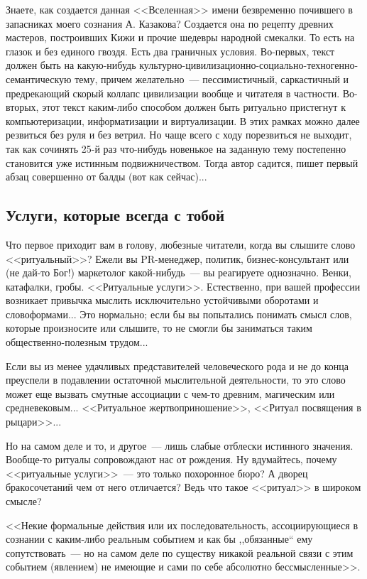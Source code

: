 \documentclass{scrbook}
\newcommand{\glqq}{,,}
\newcommand{\grqq}{``}
\newcommand{\flqq}{<<}
\newcommand{\frqq}{>>}
\newcommand{\mdash}{~--- }
\newcommand{\essaysection}[1]{\subsection*{#1}\nopagebreak}
\begin{document}
Знаете, как создается данная {\flqq}Вселенная{\frqq} имени безвременно почившего в запасниках моего сознания А. Казакова? Создается она по рецепту древних мастеров, построивших Кижи и прочие шедевры народной смекалки. То есть на глазок и без единого гвоздя. Есть два граничных условия. Во-первых, текст должен быть на какую-нибудь культурно-цивилизационно-социально-техногенно-семантическую тему, причем желательно{\mdash}пессимистичный, саркастичный и предрекающий скорый коллапс цивилизации вообще и читателя в частности. Во-вторых, этот текст каким-либо способом должен быть ритуально пристегнут к компьютеризации, информатизации и виртуализации. В этих рамках можно далее резвиться без руля и без ветрил. Но чаще всего с ходу порезвиться не выходит, так как сочинять 25-й раз что-нибудь новенькое на заданную тему постепенно становится уже истинным подвижничеством. Тогда автор садится, пишет первый абзац совершенно от балды (вот как сейчас)...

\essaysection{Услуги, которые всегда с тобой}

Что первое приходит вам в голову, любезные читатели, когда вы слышите слово {\flqq}ритуальный{\frqq}? Ежели вы PR-менеджер, политик, бизнес-консультант или (не дай-то Бог!) маркетолог какой-нибудь{\mdash}вы реагируете однозначно. Венки, катафалки, гробы. {\flqq}Ритуальные услуги{\frqq}. Естественно, при вашей профессии возникает привычка мыслить исключительно устойчивыми оборотами и словоформами... Это нормально; если бы вы попытались понимать смысл слов, которые произносите или слышите, то не смогли бы заниматься таким общественно-полезным трудом...

Если вы из менее удачливых представителей человеческого рода и не до конца преуспели в подавлении остаточной мыслительной деятельности, то это слово может еще вызвать смутные ассоциации с чем-то древним, магическим или средневековым... {\flqq}Ритуальное жертвоприношение{\frqq}, {\flqq}Ритуал посвящения в рыцари{\frqq}...

Но на самом деле и то, и другое{\mdash}лишь слабые отблески истинного значения. Вообще-то ритуалы сопровождают нас от рождения. Ну вдумайтесь, почему {\flqq}ритуальные услуги{\frqq}{\mdash}это только похоронное бюро? А дворец бракосочетаний чем от него отличается? Ведь что такое {\flqq}ритуал{\frqq} в широком смысле?

{\flqq}Некие формальные действия или их последовательность, ассоциирующиеся в сознании с каким-либо реальным событием и как бы {\glqq}обязанные{\grqq} ему сопутствовать{\mdash}но на самом деле по существу никакой реальной связи с этим событием (явлением) не имеющие и сами по себе абсолютно бессмысленные{\frqq}.
\end{document}
